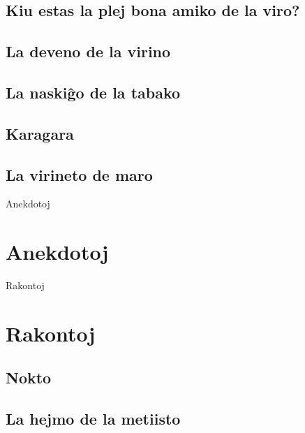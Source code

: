 \documentclass[a5paper,11pt,openany,twoside]{book}
\begin{document}
\section{Kiu estas la plej bona amiko de la viro?}
\label{plejbona}


\section{La deveno de la virino}
\label{deveno}


\section{La naski\^go de la tabako}
\label{tabako}


\section{Karagara}
\label{karagara}


\section{La virineto de maro}
\label{virineto}



 Anekdotoj

\chapter{Anekdotoj}
\label{anekdotoj}



 Rakontoj

\chapter{Rakontoj}
\section{Nokto}
\label{nokto}


\section{La hejmo de la metiisto}
\label{metiisto}

\end{document}
